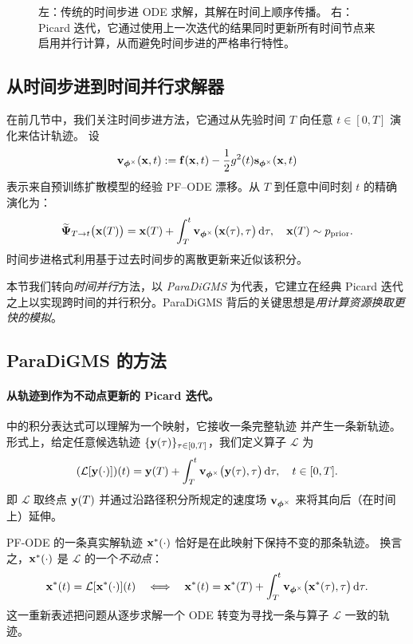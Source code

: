 \begin{figure}[th!]
  \vspace{-0.4em}
  \caption{
左：传统的时间步进 ODE 求解，其解在时间上顺序传播。
右：Picard 迭代，它通过使用上一次迭代的结果同时更新所有时间节点来启用并行计算，从而避免时间步进的严格串行特性。
}
\end{figure}



\subsection{从时间步进到时间并行求解器}

在前几节中，我们关注时间步进方法，它通过从先验时间 $T$ 向任意 $t\in[0,T]$ 演化来估计轨迹。
设
\[
{\mathbf{v}}_{{\bm{\phi}}^\times}({\mathbf{x}},t):={\mathbf{f}}({\mathbf{x}}, t) - \frac{1}{2}g^2(t) {\mathbf{s}}_{{\bm{\phi}}^\times}({\mathbf{x}},t)
\]
表示来自预训练扩散模型的经验 PF--ODE 漂移。从 $T$ 到任意中间时刻 $t$ 的精确演化为：
\begin{equation}\label{eq:picard_T_to_t}
    \widetilde{{\bm{\Psi}}}_{T\to t}\big({\mathbf{x}}(T)\big)
    =
    {\mathbf{x}}(T)
    + \int_{T}^{t}{\mathbf{v}}_{{\bm{\phi}}^\times}\big({\mathbf{x}}(\tau),\tau\big)\mathop{}\!\mathrm{d}\tau,
    \quad {\mathbf{x}}(T)\sim p_{\mathrm{prior}}.
\end{equation}
时间步进格式利用基于过去时间步的离散更新来近似该积分。

本节我们转向\emph{时间并行}方法，以 \emph{ParaDiGMS} 为代表，它建立在经典 Picard 迭代之上以实现跨时间的并行积分。ParaDiGMS 背后的关键思想是\emph{用计算资源换取更快的模拟}。



\subsection{ParaDiGMS 的方法}


\paragraph{从轨迹到作为不动点更新的 Picard 迭代。}
 中的积分表达式可以理解为一个映射，它接收一条完整轨迹
并产生一条新轨迹。
形式上，给定任意候选轨迹 $\{{\mathbf{y}}(\tau)\}_{\tau\in[0,T]}$，我们定义算子 $\mathcal{L}$ 为
\[
(\mathcal{L}[{\mathbf{y}}(\cdot)])(t)
=
{\mathbf{y}}(T)+\int_{T}^{t}{\mathbf{v}}_{{\bm{\phi}}^\times} \big({\mathbf{y}}(\tau),\tau\big)\mathop{}\!\mathrm{d}\tau,
\quad t\in[0,T].
\]
即 $\mathcal{L}$ 取终点 ${\mathbf{y}}(T)$ 并通过沿路径积分所规定的速度场 ${\mathbf{v}}_{{\bm{\phi}}^\times}$ 来将其向后（在时间上）延伸。

PF-ODE 的一条真实解轨迹 ${\mathbf{x}}^*(\cdot)$ 恰好是在此映射下保持不变的那条轨迹。
换言之，${\mathbf{x}}^*(\cdot)$ 是 $\mathcal{L}$ 的一个\emph{不动点}：
\[
{\mathbf{x}}^*(t) = \mathcal{L}[{\mathbf{x}}^*(\cdot)](t)
\quad\Longleftrightarrow\quad
{\mathbf{x}}^*(t)
= {\mathbf{x}}^*(T) + \int_{T}^{t}{\mathbf{v}}_{{\bm{\phi}}^\times} \big({\mathbf{x}}^*(\tau),\tau\big) \mathop{}\!\mathrm{d}\tau.
\]
这一重新表述把问题从逐步求解一个 ODE 转变为寻找一条与算子 $\mathcal{L}$ 一致的轨迹。


